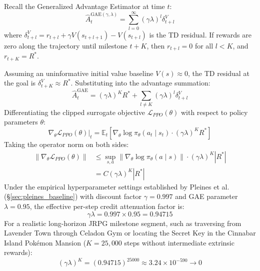 \documentclass[journal,10pt,twocolumn]{IEEEtran}
\begin{document}
\begin{IEEEproof}
Recall the Generalized Advantage Estimator at time $t$:
\begin{equation}
\hat{A}_t^{\text{GAE}(\gamma, \lambda)} = \sum_{l=0}^\infty (\gamma \lambda)^l \delta_{t+l}^V
\end{equation}
where $\delta_{t+l}^V = r_{t+l} + \gamma V(s_{t+l+1}) - V(s_{t+l})$ is the TD residual. If rewards are zero along the trajectory until milestone $t+K$, then $r_{t+l} = 0$ for all $l < K$, and $r_{t+K} = R^*$. 

Assuming an uninformative initial value baseline $V(s) \approx 0$, the TD residual at the goal is $\delta_{t+K}^V \approx R^*$. Substituting into the advantage summation:
\begin{equation}
\hat{A}_t^{\text{GAE}} = (\gamma \lambda)^K R^* + \sum_{l \ne K} (\gamma \lambda)^l \delta_{t+l}^V
\end{equation}
Differentiating the clipped surrogate objective $\mathcal{L}_{PPO}(\theta)$ with respect to policy parameters $\theta$:
\begin{equation}
\nabla_\theta \mathcal{L}_{PPO}(\theta) \Big|_{t} = \mathbb{E}_t \left[ \nabla_\theta \log \pi_\theta(a_t \mid s_t) \cdot (\gamma \lambda)^K R^* \right]
\end{equation}
Taking the operator norm on both sides:
\begin{equation}
\begin{split}
\|\nabla_\theta \mathcal{L}_{PPO}(\theta)\| &\le \sup_{s, a} \|\nabla_\theta \log \pi_\theta(a \mid s)\| \cdot (\gamma \lambda)^K |R^*| \\
&= C (\gamma \lambda)^K |R^*|
\end{split}
\end{equation}
Under the empirical hyperparameter settings established by Pleines et al.~\cite{pleines2025pokemon} (\S\ref{sec:pleines_baseline}) with discount factor $\gamma = 0.997$ and GAE parameter $\lambda = 0.95$, the effective per-step credit attenuation factor is:
\begin{equation}
\gamma \lambda = 0.997 \times 0.95 = 0.94715
\end{equation}
For a realistic long-horizon JRPG milestone segment, such as traversing from Lavender Town through Celadon Gym or locating the Secret Key in the Cinnabar Island Pok{\'e}mon Mansion ($K = 25{,}000$ steps without intermediate extrinsic rewards):
\begin{equation}
(\gamma \lambda)^K = (0.94715)^{25000} \approx 3.24 \times 10^{-590} \to 0
\end{equation}

\end{IEEEproof}
\end{document}

